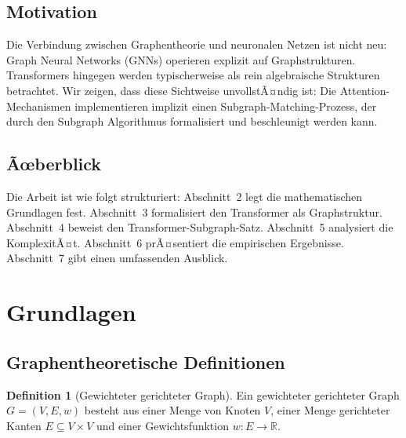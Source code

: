 ﻿\documentclass[a4paper,12pt]{article}
\theoremstyle{definition}
\newtheorem{definition}{Definition}
\begin{document}
\subsection{Motivation}

Die Verbindung zwischen Graphentheorie und neuronalen Netzen ist nicht neu:
Graph Neural Networks (GNNs) \cite{scarselli2009graph} operieren explizit auf Graphstrukturen.
Transformers hingegen werden typischerweise als rein algebraische Strukturen betrachtet.
Wir zeigen, dass diese Sichtweise unvollstÃ¤ndig ist: Die Attention-Mechanismen
implementieren implizit einen Subgraph-Matching-Prozess, der durch den Subgraph
Algorithmus formalisiert und beschleunigt werden kann.

\subsection{Ãœberblick}

Die Arbeit ist wie folgt strukturiert: Abschnitt~2 legt die mathematischen Grundlagen
fest. Abschnitt~3 formalisiert den Transformer als Graphstruktur. Abschnitt~4
beweist den Transformer-Subgraph-Satz. Abschnitt~5 analysiert die KomplexitÃ¤t.
Abschnitt~6 prÃ¤sentiert die empirischen Ergebnisse. Abschnitt~7 gibt einen
umfassenden Ausblick.

\section{Grundlagen}

\subsection{Graphentheoretische Definitionen}

\begin{definition}[Gewichteter gerichteter Graph]
	Ein gewichteter gerichteter Graph $G = (V, E, w)$ besteht aus einer Menge
	von Knoten $V$, einer Menge gerichteter Kanten $E \subseteq V \times V$
	und einer Gewichtsfunktion $w: E \to \mathbb{R}$.
\end{definition}
\end{document}
